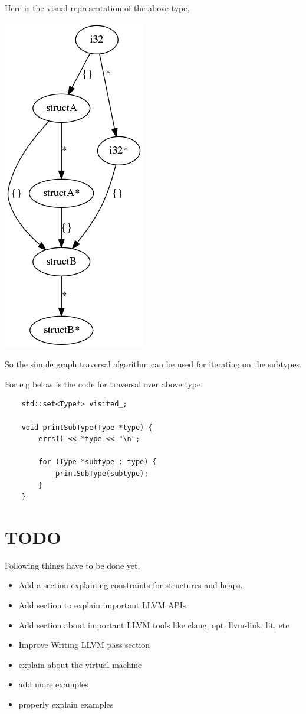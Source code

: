 \documentclass[a4paper,12pt]{report}
\begin{document}
Here is the visual representation of the above type,

\begin{center}
\includegraphics[scale=0.5]{output}
\end{center}

\noindent
So the simple graph traversal algorithm can be used for iterating on the
subtypes.

\noindent
For e.g below is the code for traversal over above type

\begin{verbatim}
    std::set<Type*> visited_;

    void printSubType(Type *type) {
        errs() << *type << "\n";

        for (Type *subtype : type) {
            printSubType(subtype);
        }
    }

\end{verbatim}

\chapter{TODO}
Following things have to be done yet,
\begin{itemize}
 \item Add a section explaining constraints for structures and heaps.
 \item Add section to explain important LLVM APIs.
 \item Add section about important LLVM tools like clang, opt, llvm-link, lit, etc
 \item Improve Writing LLVM pass section
 \item explain about the virtual machine
 \item add more examples
 \item properly explain examples
\end{itemize}



\end{document}
